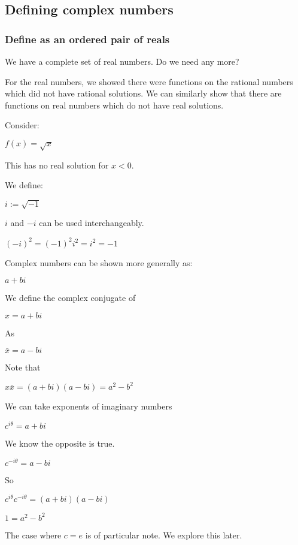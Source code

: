 
\subsection{Defining complex numbers}
\subsubsection{Define as an ordered pair of reals}

We have a complete set of real numbers. Do we need any more?

For the real numbers, we showed there were functions on the rational numbers which did not have rational solutions. We can similarly show that there are functions on real numbers which do not have real solutions.

Consider:

$f(x)=\sqrt x$

This has no real solution for \(x<0\).

We define:

$i:=\sqrt {-1}$

\(i\) and \(-i\) can be used interchangeably.

$(-i)^2=(-1)^2i^2=i^2=-1$

Complex numbers can be shown more generally as:

$a+bi$

We define the complex conjugate of

$x=a+bi$

As

$\bar x=a-bi$

Note that

$x\bar x=(a+bi)(a-bi)=a^2-b^2$

We can take exponents of imaginary numbers

$c^{i\theta}=a+bi$

We know the opposite is true.

$c^{-i\theta}=a-bi$

So

$c^{i\theta}c^{-i\theta}=(a+bi)(a-bi)$

$1=a^2-b^2$

The case where \(c=e\) is of particular note. We explore this later.

